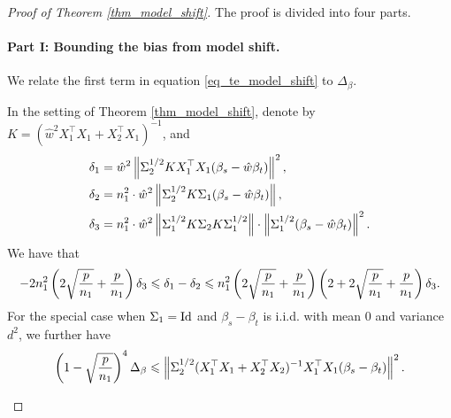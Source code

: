 \begin{proof}[Proof of Theorem \ref{thm_model_shift}]

The proof is divided into four parts.

\paragraph{Part I: Bounding the bias from model shift.}
We relate the first term in equation \eqref{eq_te_model_shift} to $\Delta_{\beta}$.
\begin{proposition}\label{prop_model_shift}
	In the setting of Theorem \ref{thm_model_shift},
	denote by $K = (\hat{w}^2X_1^{\top}X_1 + X_2^{\top}X_1)^{-1}$, and
	\begin{align*}
		\delta_1 &= \hat{w}^2 \left\| \Sigma_2^{1/2} K X_1^{\top}X_1(\beta_s - \hat{w}\beta_t) \right\|^2, \\
		\delta_2 &= n_1^2\cdot \hat{w}^2 \left\| \Sigma_2^{1/2}K\Sigma_1(\beta_s - \hat{w}\beta_t) \right\|, \\
		\delta_3 &= n_1^2\cdot \hat{w}^2 \left\| \Sigma_1^{1/2} K \Sigma_2 K \Sigma_1^{1/2} \right\| \cdot \left\| \Sigma_1^{1/2} (\beta_s - \hat{w}\beta_t) \right\|^2.
	\end{align*}
	We have that
	\begin{align*}
		-2n_1^2\left({{2\sqrt{\frac{p}{n_1}}} + {\frac{p}{n_1}}}\right) \delta_3
		\leqslant  \delta_1 - \delta_2
		\leqslant n_1^2\left({2\sqrt{\frac{p}{n_1}} + \frac{p}{n_1}}\right)\left({2 + 2\sqrt{\frac{p}{n_1}} + \frac{p}{n_1}}\right)\delta_3.
	\end{align*}
	For the special case when $\Sigma_1 = \operatorname{Id}$ and $\beta_s - \beta_t$ is i.i.d. with mean $0$ and variance $d^2$, we further have
	\begin{align*}
		\left({1 - \sqrt{\frac{p}{n_1}}}\right)^4 \Delta_{\beta}
		\leqslant \left\| \Sigma_2^{1/2} (X_1^{\top}X_1 + X_2^{\top}X_2)^{-1}X_1^{\top}X_1(\beta_s - \beta_t) \right\|^2.
	\end{align*}
\end{proposition}


\end{proof}
